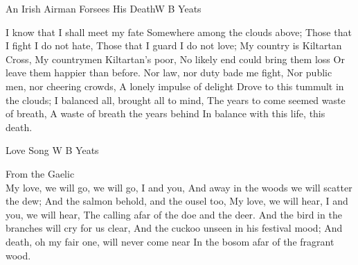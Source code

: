  

\begin{poem}{An Irish Airman Forsees His Death}{W B Yeats}

I know that I shall meet my fate 
Somewhere among the clouds above; 
Those that I fight I do not hate, 
Those that I guard I do not love; 
My country is Kiltartan Cross, 
My countrymen Kiltartan's poor, 
No likely end could bring them loss 
Or leave them happier than before. 
Nor law, nor duty bade me fight, 
Nor public men, nor cheering crowds, 
A lonely impulse of delight 
Drove to this tummult in the clouds; 
I balanced all, brought all to mind, 
The years to come seemed waste of breath, 
A waste of breath the years behind 
In balance with this life, this death. \\
\end{poem}

 

\begin{poem}{Love Song }{W B Yeats}

From the Gaelic\\

My love, we will go, we will go, I and you, 
And away in the woods we will scatter the dew; 
And the salmon behold, and the ousel too, 
My love, we will hear, I and you, we will hear, 
The calling afar of the doe and the deer. 
And the bird in the branches will cry for us clear, 
And the cuckoo unseen in his festival mood; 
And death, oh my fair one, will never come near 
In the bosom afar of the fragrant wood. \\
\end{poem}


 

